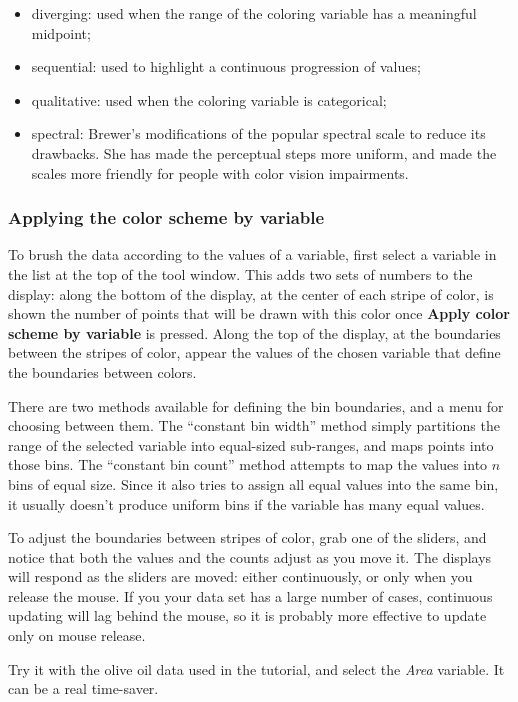 \documentclass[11pt]{article}
\begin{document}
\begin{itemize}
\item diverging: used when the range of the coloring variable has
      a meaningful midpoint;
\item sequential: used to highlight a continuous progression of values;
\item qualitative: used when the coloring variable is categorical;
\item spectral: Brewer's modifications of the popular spectral scale
      to reduce its drawbacks.  She has made the perceptual steps
      more uniform, and made the scales more friendly for people with
      color vision impairments.
\end{itemize}

\subsubsection{Applying the color scheme by variable}

To brush the data according to the values of a variable, first select
a variable in the list at the top of the tool window.  This adds two
sets of numbers to the display:  along the bottom of the display, at
the center of each stripe of color, is shown the number of points that
will be drawn with this color once {\bf Apply color scheme by variable}
is pressed.  Along the top of the display, at the boundaries between the
stripes of color, appear the values of the chosen variable that define
the boundaries between colors. 

There are two methods available for defining the bin boundaries, and
a menu for choosing between them.  The ``constant bin width'' method
simply partitions the range of the selected variable into equal-sized
sub-ranges, and maps points into those bins.  The ``constant bin
count'' method attempts to map the values into $n$ bins of equal
size.  Since it also tries to assign all equal values into the same
bin, it usually doesn't produce uniform bins if the variable has many
equal values.

To adjust the boundaries between stripes of color, grab one of the
sliders, and notice that both the values and the counts adjust as you
move it.  The displays will respond as the sliders are moved:  either
continuously, or only when you release the mouse.  If you your data set
has a large number of cases, continuous updating will lag behind the
mouse, so it is probably more effective to update only on mouse release.

Try it with the olive oil data used in the tutorial, and select the {\it
Area} variable.  It can be a real time-saver.
\end{document}
